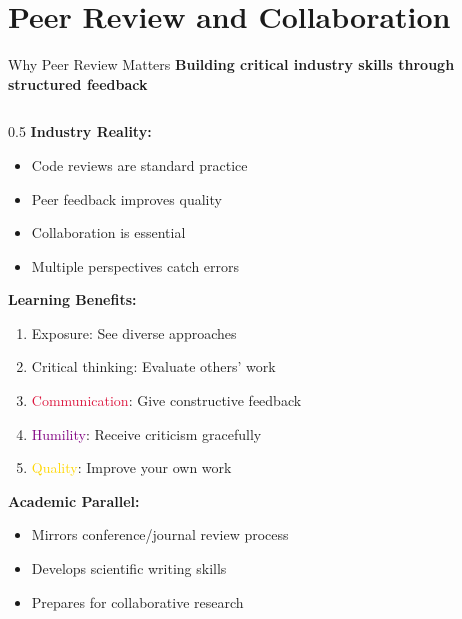 
\section{Peer Review and Collaboration}


\begin{frame}{Why Peer Review Matters}
\textbf{Building critical industry skills through structured feedback}

\begin{columns}
\begin{column}{0.5\textwidth}
\textbf{Industry Reality:}
\begin{itemize}
\item Code reviews are standard practice
\item Peer feedback improves quality
\item Collaboration is essential
\item Multiple perspectives catch errors
\end{itemize}

\vspace{0.3cm}

\textbf{Learning Benefits:}
\begin{enumerate}
\item \textcolor{forest}{Exposure}: See diverse approaches
\item \textcolor{navyblue}{Critical thinking}: Evaluate others' work
\item \textcolor{crimson}{Communication}: Give constructive feedback
\item \textcolor{purple}{Humility}: Receive criticism gracefully
\item \textcolor{gold}{Quality}: Improve your own work
\end{enumerate}

\vspace{0.3cm}

\textbf{Academic Parallel:}
\begin{itemize}
\item Mirrors conference/journal review process
\item Develops scientific writing skills
\item Prepares for collaborative research
\end{itemize}
\end{column}


\end{columns}
\end{frame}
